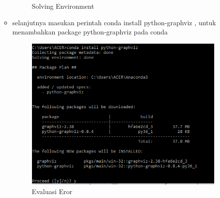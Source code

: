 \begin{enumerate}
\begin{itemize}
\begin{figure}[ht]
\caption{Solving Environment}
\label{solusi}
\end{figure}
\item
selanjutnya masukan perintah conda install python-graphviz , untuk menambahkan package python-graphviz pada conda
\begin{figure}[ht]
\centering
\includegraphics[scale=0.5]{figures/spyder/23.png}
\caption{Evaluasi Eror}
\label{Eror}
\end{figure}
\end{itemize}
\end{enumerate}

